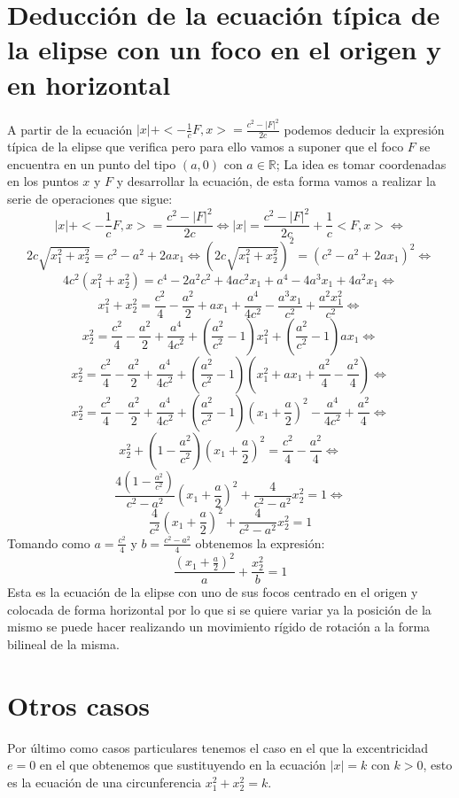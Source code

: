 \documentclass[a4paper, 11pt]{article} %
\begin{document}
	\section{Deducción de la ecuación típica de la elipse con un foco en el origen y en horizontal}
	A partir de la ecuación $|x|+<-\frac{1}{c}F,x> = \frac{c^2-|F|^2}{2c}$ podemos deducir la expresión típica de la elipse que verifica pero para ello vamos a suponer que el foco $F$ se encuentra en un punto del tipo $(a, 0)$ con $a\in \mathbb{R}$; La idea es tomar coordenadas en los puntos $x$ y $F$ y desarrollar la ecuación, de esta forma vamos a realizar la serie de operaciones que sigue:
	$$|x|+<-\frac{1}{c}F,x> = \frac{c^2-|F|^2}{2c} \Leftrightarrow |x| = \frac{c^2-|F|^2}{2c}+\frac{1}{c}<F,x> \Leftrightarrow$$
	$$2c\sqrt{x_1^2+x_2^2} = c^2-a^2+2ax_1 \Leftrightarrow (2c\sqrt{x_1^2+x_2^2})^2 = (c^2-a^2+2ax_1)^2 \Leftrightarrow$$
	$$4c^2(x_1^2+x_2^2)=c^4-2a^2c^2+4ac^2x_1+a^4-4a^3x_1+4a^2x_1 \Leftrightarrow$$
	$$x_1^2+x_2^2=\frac{c^2}{4}-\frac{a^2}{2}+ax_1+\frac{a^4}{4c^2}-\frac{a^3x_1}{c^2}+\frac{a^2x_1^2}{c^2} \Leftrightarrow$$
	$$x_2^2 = \frac{c^2}{4}-\frac{a^2}{2}+\frac{a^4}{4c^2}+(\frac{a^2}{c^2}-1)x_1^2 +(\frac{a^2}{c^2}-1)ax_1 \Leftrightarrow$$
	$$x_2^2 = \frac{c^2}{4}-\frac{a^2}{2}+\frac{a^4}{4c^2}+(\frac{a^2}{c^2}-1)(x_1^2 +ax_1+\frac{a^2}{4}-\frac{a^2}{4}) \Leftrightarrow$$
	$$x_2^2 = \frac{c^2}{4}-\frac{a^2}{2}+\frac{a^4}{4c^2}+(\frac{a^2}{c^2}-1)(x_1+\frac{a}{2})^2-\frac{a^4}{4c^2}+\frac{a^2}{4} \Leftrightarrow$$
	$$x_2^2+(1-\frac{a^2}{c^2})(x_1+\frac{a}{2})^2=\frac{c^2}{4}-\frac{a^2}{4} \Leftrightarrow$$
	$$\frac{4(1-\frac{a^2}{c^2})}{c^2-a^2}(x_1+\frac{a}{2})^2+\frac{4}{c^2-a^2}x_2^2=1 \Leftrightarrow$$
	$$\frac{4}{c^2}(x_1+\frac{a}{2})^2+\frac{4}{c^2-a^2}x_2^2=1$$
	Tomando como $a = \frac{c^2}{4}$ y $b = \frac{c^2-a^2}{4}$ obtenemos la expresión:
	$$\frac{(x_1+\frac{a}{2})^2}{a}+\frac{x_2^2}{b}=1$$
	Esta es la ecuación de la elipse con uno de sus focos centrado en el origen y colocada de forma horizontal por lo que si se quiere variar ya la posición de la mismo se puede hacer realizando un movimiento rígido de rotación a la forma bilineal de la misma.
	\section{Otros casos}
	Por último como casos particulares tenemos el caso en el que la excentricidad $e = 0$ en el que obtenemos que sustituyendo en la ecuación $|x|=k$ con $k >0$, esto es la ecuación de una circunferencia $x_1^2+x_2^2=k$.
	
\end{document}
